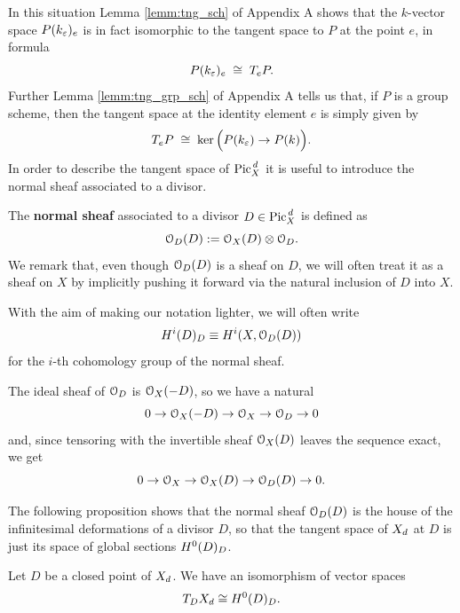 	In this situation Lemma \ref{lemm:tng_sch} of Appendix A shows that the $k$-vector space $P(k_\varepsilon)_e$ is in fact isomorphic to the tangent space to $P$ at the point $e$, in formula
	$$ P(k_\varepsilon)_e \; \cong \; T_e P. $$
	Further Lemma \ref{lemm:tng_grp_sch} of Appendix A tells us that, if $P$ is a group scheme, then the tangent space at the identity element $e$ is simply given by
	$$ T_e P \;\cong\; \ker \Big( P(k_\varepsilon) \to P(k) \Big). $$
	In order to describe the tangent space of $ \operatorname{Pic}^{\,d}_X$ it is useful to introduce the normal sheaf associated to a divisor.
	\begin{defi}
		The \textbf{normal sheaf} associated to a divisor $D\in  \operatorname{Pic}^{\,d}_X$ is defined as
		$$ \mathcal{O}_D(D) := \mathcal{O}_X(D) \otimes \mathcal{O}_D. $$
		We remark that, even though $\mathcal{O}_D(D)$ is a sheaf on $D$, we will often treat it as a sheaf on $X$ by implicitly pushing it forward via the natural inclusion of $D$ into $X$. 
	\end{defi}
	\begin{notation}
		With the aim of making our notation lighter, we will often write 
		$$ H^i(D)_{D} \equiv H^i(X,\mathcal{O}_D(D))$$ 
		for the $i$-th cohomology group of the normal sheaf.
	\end{notation}
	\begin{rema}\label{rema:div_ses}
		The ideal sheaf of $\mathcal{O}_D$ is $\mathcal{O}_X(-D)$, so we have a natural \ses
		$$ 0 \to \mathcal{O}_X(-D) \to \mathcal{O}_X \to \mathcal{O}_D \to 0 $$
		and, since tensoring with the invertible sheaf $\mathcal{O}_X(D)$ leaves the sequence exact, we get
		$$ 0 \to \mathcal{O}_X \to \mathcal{O}_X(D) \to \mathcal{O}_D(D) \to 0. $$			
	\end{rema}
	The following proposition shows that the normal sheaf $\mathcal{O}_D(D)$ is the house of the infinitesimal deformations of a divisor $D$, so that the tangent space of $X_d$ at $D$ is just its space of global sections $H^0(D)_D$.
	\begin{prop}\label{prop:tgn_div}
		Let $D$ be a closed point of $ X_d$. We have an isomorphism of vector spaces
		$$ T_D X_d \cong H^0(D)_D. $$
	\end{prop}
